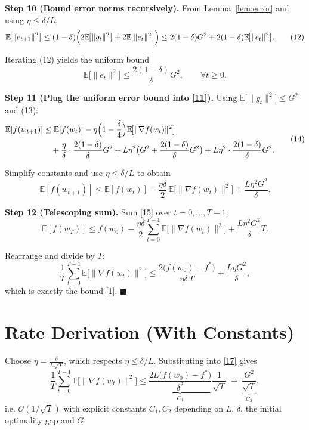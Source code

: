 \documentclass{article}
\begin{document}
\noindent\textbf{Step 10 (Bound error norms recursively).}  
From Lemma~\ref{lem:error} and using $\eta\le\delta/L$,
\[
\mathbb{E}\!\bigl[\|e_{t+1}\|^{2}\bigr]
\le (1-\delta)\Bigl(2\mathbb{E}\!\bigl[\|g_{t}\|^{2}\bigr]
+2\mathbb{E}\!\bigl[\|e_{t}\|^{2}\bigr]\Bigr)
\le 2(1-\delta)G^{2}+2(1-\delta)\mathbb{E}\!\bigl[\|e_{t}\|^{2}\bigr].
\tag{12}
\]

Iterating (12) yields the uniform bound
\[
\mathbb{E}\!\bigl[\|e_{t}\|^{2}\bigr]\le\frac{2(1-\delta)}{\delta}G^{2},
\qquad\forall t\ge0.
\tag{13}
\]

\noindent\textbf{Step 11 (Plug the uniform error bound into \eqref{11}).}  
Using $\mathbb{E}\!\bigl[\|g_{t}\|^{2}\bigr]\le G^{2}$ and (13):
\[
\begin{aligned}
\mathbb{E}[f(w_{t+1})]
&\le \mathbb{E}[f(w_{t})]
-\eta\Bigl(1-\frac{\delta}{4}\Bigr)\mathbb{E}\!\bigl[\|\nabla f(w_{t})\|^{2}\bigr] \\
&\quad +\frac{\eta}{\delta}\cdot\frac{2(1-\delta)}{\delta}G^{2}
+L\eta^{2}\bigl(G^{2}+\frac{2(1-\delta)}{\delta}G^{2}\bigr)
+L\eta^{2}\cdot\frac{2(1-\delta)}{\delta}G^{2}.
\end{aligned}
\tag{14}
\]

Simplify constants and use $\eta\le\delta/L$ to obtain
\[
\mathbb{E}[f(w_{t+1})]\le\mathbb{E}[f(w_{t})]
-\frac{\eta\delta}{2}\,\mathbb{E}\!\bigl[\|\nabla f(w_{t})\|^{2}\bigr]
+\frac{L\eta^{2}G^{2}}{\delta}.
\tag{15}
\]

\noindent\textbf{Step 12 (Telescoping sum).}  
Sum \eqref{15} over $t=0,\dots,T-1$:
\[
\mathbb{E}[f(w_{T})]\le f(w_{0})
-\frac{\eta\delta}{2}\sum_{t=0}^{T-1}\mathbb{E}\!\bigl[\|\nabla f(w_{t})\|^{2}\bigr]
+\frac{L\eta^{2}G^{2}}{\delta}T .
\tag{16}
\]

Rearrange and divide by $T$:
\[
\frac{1}{T}\sum_{t=0}^{T-1}\mathbb{E}\!\bigl[\|\nabla f(w_{t})\|^{2}\bigr]
\le \frac{2\bigl(f(w_{0})-f^{*}\bigr)}{\eta\delta\,T}
+\frac{L\eta G^{2}}{\delta},
\tag{17}
\]
which is exactly the bound \eqref{1}. \hfill $\blacksquare$

\section*{Rate Derivation (With Constants)}
Choose $\eta=\frac{\delta}{L\sqrt{T}}$, which respects $\eta\le\delta/L$. Substituting into \eqref{17} gives
\[
\frac{1}{T}\sum_{t=0}^{T-1}\mathbb{E}\!\bigl[\|\nabla f(w_{t})\|^{2}\bigr]
\le
\underbrace{\frac{2L\bigl(f(w_{0})-f^{*}\bigr)}{\delta^{2}}}_{C_{1}}
\frac{1}{\sqrt{T}}
\;+\;
\underbrace{\frac{G^{2}}{\sqrt{T}}}_{C_{2}},
\]
i.e. $\mathcal{O}(1/\sqrt{T})$ with explicit constants $C_{1},C_{2}$ depending on $L$, $\delta$, the initial optimality gap and $G$.
\end{document}
